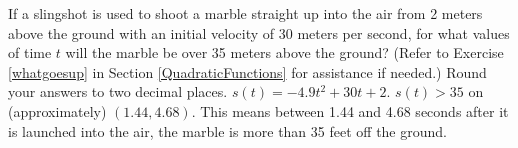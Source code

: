 {If a slingshot is used to shoot a marble straight up into the air from 2 meters above the ground with an initial velocity of 30 meters per second, for what values of time $t$ will the marble be over 35 meters above the ground? (Refer to Exercise \ref{whatgoesup} in Section \ref{QuadraticFunctions} for assistance if needed.)  Round your answers to two decimal places.}
{$s(t) = -4.9t^2 + 30t + 2$.  $s(t) > 35$ on (approximately)  $(1.44, 4.68)$.  This means between 1.44 and 4.68 seconds after it is launched into the air, the marble is more than 35 feet off the ground. }